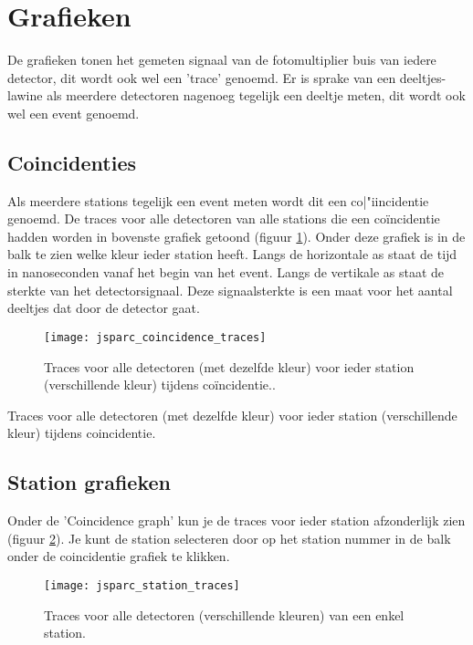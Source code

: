 \section{Grafieken}

De grafieken tonen het gemeten signaal van de fotomultiplier buis van iedere detector, dit wordt ook wel een 'trace' genoemd. Er is sprake van een deeltjes-lawine als meerdere detectoren nagenoeg tegelijk een deeltje meten, dit wordt ook wel een event genoemd.

\subsection{Coincidenties}

Als meerdere stations tegelijk een event meten wordt dit een co|"{i}incidentie genoemd.
De traces voor alle detectoren van alle stations die een co\"incidentie hadden
worden in bovenste grafiek getoond (figuur \ref{fig:stationtrace}). Onder deze grafiek is in de balk te zien
welke kleur ieder station heeft.  Langs de horizontale as staat de tijd in
nanoseconden vanaf het begin van het event. Langs de vertikale as staat de
sterkte van het detectorsignaal. Deze signaalsterkte is een maat voor het aantal deeltjes dat
door de detector gaat.

\begin{figure}[H]
    \centering
    \texttt{[image: jsparc\_coincidence\_traces]}
    \caption{Traces voor alle detectoren (met dezelfde kleur) voor ieder station
                 (verschillende kleur) tijdens co\"incidentie..}
    \label{fig:stationtrace}
\end{figure}

   Traces voor alle detectoren (met dezelfde kleur) voor ieder station
   (verschillende kleur) tijdens coincidentie.

\subsection{Station grafieken}

Onder de 'Coincidence graph' kun je de traces voor ieder station afzonderlijk
zien (figuur \ref{fig:detectortrace}). Je kunt de station selecteren door op het station nummer in de balk
onder de coincidentie grafiek te klikken.

\begin{figure}[H]
    \centering
    \texttt{[image: jsparc\_station\_traces]}
    \caption{Traces voor alle detectoren (verschillende kleuren) van een enkel station.}
    \label{fig:detectortrace}
\end{figure}

